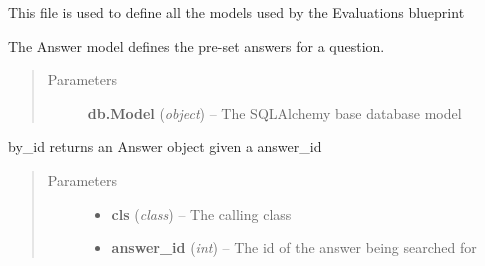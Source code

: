 \documentclass[letterpaper,10pt,english]{sphinxmanual}
\begin{document}
This file is used to define all the models used by the Evaluations blueprint

\begin{fulllineitems}
\label{dev-evaluations:cagenix.evaluations.models.Answer}
The Answer model defines the pre-set answers for a question.
\begin{quote}\begin{description}
\item[{Parameters}] \leavevmode
\textbf{db.Model} (\emph{object}) -- The SQLAlchemy base database model

\end{description}\end{quote}

\begin{fulllineitems}
\label{dev-evaluations:cagenix.evaluations.models.Answer.by_id}
by\_id returns an Answer object given a answer\_id
\begin{quote}\begin{description}
\item[{Parameters}] \leavevmode\begin{itemize}
\item {} 
\textbf{cls} (\emph{class}) -- The calling class

\item {} 
\textbf{answer\_id} (\emph{int}) -- The id of the answer being searched for

\end{itemize}

\end{description}\end{quote}

\end{fulllineitems}


\end{fulllineitems}

\end{document}
